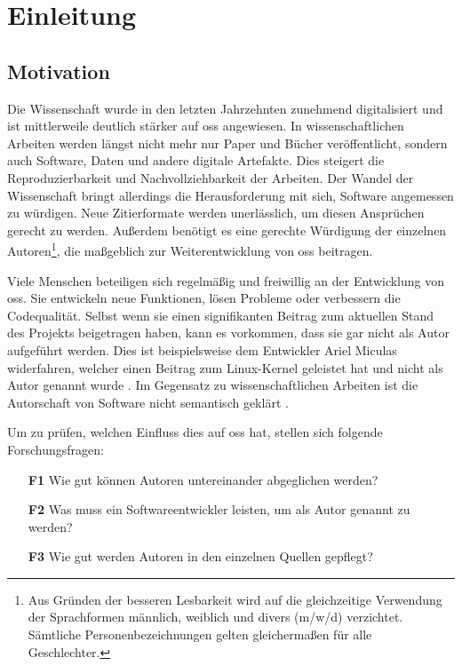 \chapter{Einleitung}
\label{chap:einleitung}
\section{Motivation}
\label{sec:motivation}
Die Wissenschaft wurde in den letzten Jahrzehnten zunehmend digitalisiert und ist mittlerweile deutlich stärker auf \gls{oss} angewiesen.
In wissenschaftlichen Arbeiten werden längst nicht mehr nur Paper und Bücher veröffentlicht, sondern auch Software, Daten und andere digitale Artefakte.
Dies steigert die Reproduzierbarkeit und Nachvollziehbarkeit der Arbeiten.
Der Wandel der Wissenschaft bringt allerdings die Herausforderung mit sich, Software angemessen zu würdigen.
Neue Zitierformate werden unerlässlich, um diesen Ansprüchen gerecht zu werden.
Außerdem benötigt es eine gerechte Würdigung der einzelnen Autoren\footnote{Aus Gründen der besseren Lesbarkeit wird auf die gleichzeitige Verwendung der Sprachformen männlich, weiblich und divers (m/w/d) verzichtet. Sämtliche Personenbezeichnungen gelten gleichermaßen für alle Geschlechter.}, die maßgeblich zur Weiterentwicklung von \gls{oss} beitragen.

Viele Menschen beteiligen sich regelmäßig und freiwillig an der Entwicklung von \gls{oss}.
Sie entwickeln neue Funktionen, lösen Probleme oder verbessern die Codequalität.
Selbst wenn sie einen signifikanten Beitrag zum aktuellen Stand des Projekts beigetragen haben, kann es vorkommen, dass sie gar nicht als Autor aufgeführt werden.
Dies ist beispielsweise dem Entwickler Ariel Miculas widerfahren, welcher einen Beitrag zum Linux-Kernel geleistet hat und nicht als Autor genannt wurde \autocite{miculas_how_2023}.
Im Gegensatz zu wissenschaftlichen Arbeiten ist die Autorschaft von Software nicht semantisch geklärt \autocite{schmidt_software_nodate}.

Um zu prüfen, welchen Einfluss dies auf \gls{oss} hat, stellen sich folgende Forschungsfragen:

\begin{itemize}
    \item[\textbf{F1}] Wie gut können Autoren untereinander abgeglichen werden?
    \item[\textbf{F2}] Was muss ein Softwareentwickler leisten, um als Autor genannt zu werden?
    \item[\textbf{F3}] Wie gut werden Autoren in den einzelnen Quellen gepflegt?
\end{itemize}

